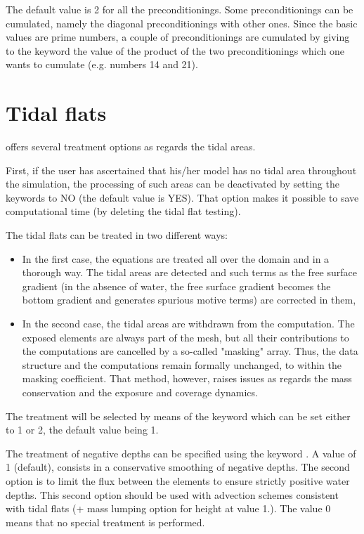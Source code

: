 The default value is 2 for all the preconditionings. Some preconditionings can
be cumulated, namely the diagonal preconditionings with other ones. Since the
basic values are prime numbers, a couple of preconditionings are cumulated by
giving to the keyword the value of the product of the two preconditionings
which one wants to cumulate (e.g. numbers 14 and 21).

\section{Tidal flats}

 offers several treatment options as regards the tidal areas.

First, if the user has ascertained that his/her model has no tidal area
throughout the simulation, the processing of such areas can be deactivated by
setting the keywords  to NO (the default value is YES).
That option makes it possible to save computational time (by deleting the tidal
flat testing).

The tidal flats can be treated in two different ways:

\begin{itemize}
\item In the first case, the equations are treated all over the domain and in
a thorough way. The tidal areas are detected and such terms as the free surface
gradient (in the absence of water, the free surface gradient becomes the bottom
gradient and generates spurious motive terms) are corrected in them,

\item In the second case, the tidal areas are withdrawn from the computation.
The exposed elements are always part of the mesh, but all their contributions
to the computations are cancelled by a so-called "masking" array. Thus, the
data structure and the computations remain formally unchanged, to within the
masking coefficient. That method, however, raises issues as regards the mass
conservation and the exposure and coverage dynamics.
\end{itemize}

The treatment will be selected by means of the keyword  which can be set either to 1 or 2, the default value
being 1.

The treatment of negative depths can be specified using the keyword
. A value of 1 (default), consists in a
conservative smoothing of negative depths. The second option is to limit the
flux between the elements to ensure strictly positive water depths. This second
option should be used with advection schemes consistent with tidal flats (+
mass lumping option for height at value 1.). The value 0 means that no special
treatment is performed.

